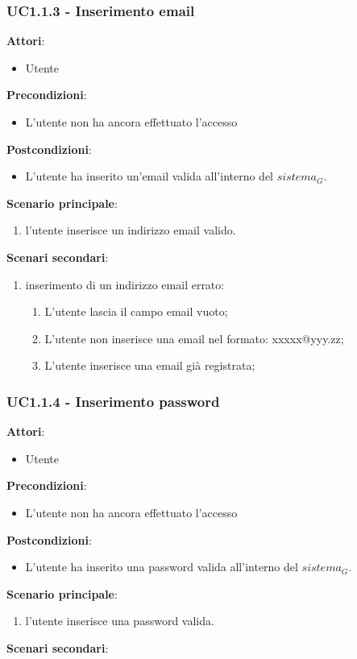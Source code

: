 \subsubsection{UC1.1.3 - Inserimento email}\label{usecase:1_1_3}
\textbf{Attori}:
\begin{itemize}
    \item Utente
\end{itemize}
\textbf{Precondizioni}:
\begin{itemize}
    \item L'utente non ha ancora effettuato l'accesso
\end{itemize}
\textbf{Postcondizioni}:
\begin{itemize}
    \item L'utente ha inserito un'email valida all'interno del $\textit{sistema}_G$.
\end{itemize}
\textbf{Scenario principale}:
\begin{enumerate}
    \item l'utente inserisce un indirizzo email valido.
\end{enumerate}
\textbf{Scenari secondari}:

\begin{enumerate}
    \item inserimento di un indirizzo email errato:
    \begin{enumerate}
            \item L'utente lascia il campo email vuoto;
            \item L'utente non inserisce una email nel formato: xxxxx@yyy.zz;
            \item L'utente inserisce una email già registrata;
        \end{enumerate} 
\end{enumerate}

\subsubsection{UC1.1.4 - Inserimento password}\label{usecase:1_1_4}
\textbf{Attori}:
\begin{itemize}
    \item Utente
\end{itemize}
\textbf{Precondizioni}:
\begin{itemize}
    \item L'utente non ha ancora effettuato l'accesso
\end{itemize}
\textbf{Postcondizioni}:
\begin{itemize}
    \item L'utente ha inserito una password valida all'interno del $\textit{sistema}_G$.
\end{itemize}
\textbf{Scenario principale}:
\begin{enumerate}
    \item l'utente inserisce una password valida.
\end{enumerate}
\textbf{Scenari secondari}:

